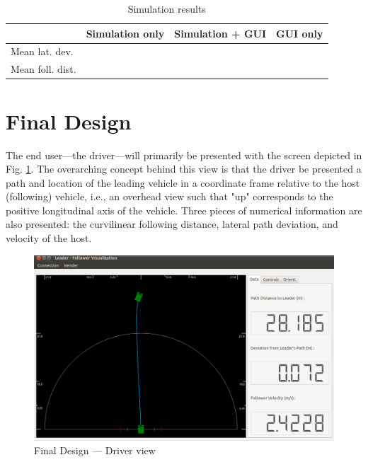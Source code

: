 \documentclass[12pt]{report}
\begin{document}
\begin{table}[ht] \centering
    \label{tab:simexper}
    \caption{Simulation results}
    \begin{tabular}{l||c|c|c} \hline
                        &          \textbf{Simulation only}&    \textbf{Simulation + GUI}&       \textbf{GUI only}\\ \hline\hline
        Mean lat. dev.&          &                   &                       \\ \hline
        Mean foll. dist.&         &                   &                       \\ \hline

\end{tabular} \end{table}


\section{Final Design}
\label{sec:finaldes}

The end user---the driver---will primarily be presented with the screen depicted in Fig. \ref{fig:finaldesdriv}. The overarching concept behind this view is that the driver be presented a path and location of the leading vehicle in a coordinate frame relative to the host (following) vehicle, i.e., an overhead view such that "up" corresponds to the positive longitudinal axis of the vehicle. Three pieces of numerical information are also presented: the curvilinear following distance, lateral path deviation, and velocity of the host. 

\begin{figure}[ht] \centering
    \includegraphics[width=6.5in]{./figs/final_design_data.png}
    \caption{Final Design --- Driver view}
    \label{fig:finaldesdriv}
\end{figure}
\end{document}

